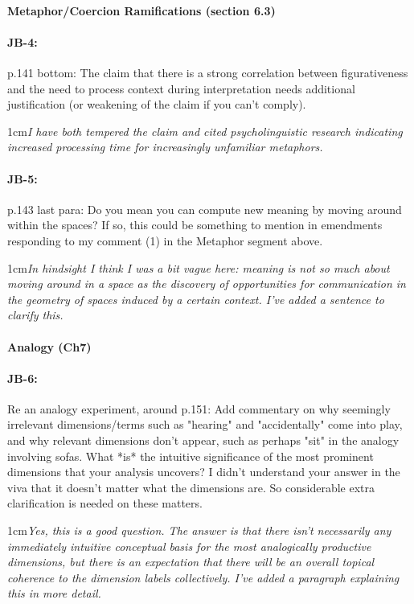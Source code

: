 \documentclass[11pt,a4paper]{article}
\newcommand{\res}[1]{\vspace{0.25cm} \begin{adjustwidth}{1cm}{}\emph{#1}\end{adjustwidth}}
\begin{document}
\paragraph{Metaphor/Coercion Ramifications (section 6.3)}

\paragraph{JB-4:} p.141 bottom: The claim that there is a strong correlation between figurativeness and the need to process context during interpretation needs additional justification (or weakening of the claim if you can't comply).

\res{I have both tempered the claim and cited psycholinguistic research indicating increased processing time for increasingly unfamiliar metaphors.}

\paragraph{JB-5:} p.143 last para: Do you mean you can compute new meaning by moving around within the spaces? If so, this could be something to mention in emendments responding to my comment (1) in the Metaphor segment above.

\res{In hindsight I think I was a bit vague here: meaning is not so much about moving around in a space as the discovery of opportunities for communication in the geometry of spaces induced by a certain context.  I've added a sentence to clarify this.}


\paragraph{Analogy  (Ch7)}

\paragraph{JB-6:} Re an analogy experiment, around p.151: Add commentary on why seemingly irrelevant dimensions/terms such as "hearing" and "accidentally" come into play, and why relevant dimensions don't appear, such as perhaps "sit" in the analogy involving sofas. What *is* the intuitive significance of the most prominent dimensions that your analysis uncovers? I didn't understand your answer in the viva that it doesn't matter what the dimensions are. So considerable extra clarification is needed on these matters.

\res{Yes, this is a good question.  The answer is that there isn't necessarily any immediately intuitive conceptual basis for the most analogically productive dimensions, but there is an expectation that there will be an overall topical coherence to the dimension labels collectively.  I've added a paragraph explaining this in more detail.}
\end{document}
